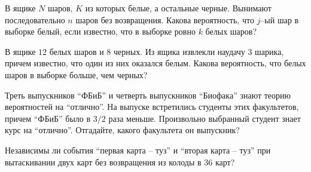 \begin{problem}
    В ящике $N$ шаров, $K$ из которых белые, а остальные черные.
    Вынимают последовательно $n$ шаров без возвращения.
    Какова вероятность, что $j$–ый шар в выборке белый, если известно, что в выборке ровно $k$ белых шаров?
\end{problem}

\begin{problem}
    В ящике $12$ белых шаров и $8$ черных.
    Из ящика извлекли наудачу $3$ шарика, причем известно, что один из них оказался белым.
    Какова вероятность, что белых шаров в выборке больше, чем черных?
\end{problem}


\begin{problem}
    Треть выпускников ``ФБиБ'' и четверть выпускников ``Биофака'' знают теорию вероятностей на ``отлично''.
    На выпуске встретились студенты этих факультетов, причем ``ФБиБ'' было в $ 3 / 2$ раза меньше.
    Произвольно выбранный студент знает курс на ``отлично''.
    Отгадайте, какого факультета он выпускник?
\end{problem}

\begin{problem}
    Независимы ли события ``первая карта -- туз'' и ``вторая карта -- туз'' при вытаскивании двух карт без возвращения из колоды в $36$ карт?
\end{problem}



